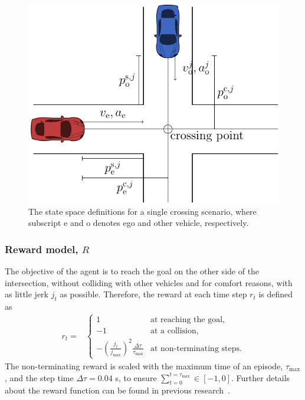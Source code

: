 
\begin{figure}[!t]
	\centering
		\includegraphics[width=0.65\columnwidth]{figures/figures-states.pdf}
		\caption{The state space definitions for a single crossing scenario, where subscript e and o denotes ego and other vehicle, respectively.}
	\label{fig:states}
\end{figure}


\subsubsection{Reward model, $R$}
The objective of the agent is to reach the goal on the other side of the intersection, without colliding with other vehicles and for comfort reasons, with as little jerk $j_t$ as possible. Therefore, the reward at each time step $r_t$ is defined as
\begin{align*}
r_t = &\begin{cases}
1 & \text{at reaching the goal, }\\
-1 & \text{at a collision},\\
-\left(\frac{j_t}{j_{\max}}\right)^2\frac{\Delta \tau}{\tau_\mathrm{max}}         & \text{at non-terminating steps.}
\label{eq:reward}
\end{cases} 
\end{align*}
The non-terminating reward is scaled with the maximum time of an episode, $\tau_\mathrm{max}$, and the step time $\Delta \tau=0.04$ s, to ensure $\sum_{t=0}^{t=\tau_\mathrm{max}} \in [-1,0]$. Further details about the reward function can be found in previous research~\cite{tram2019}.

